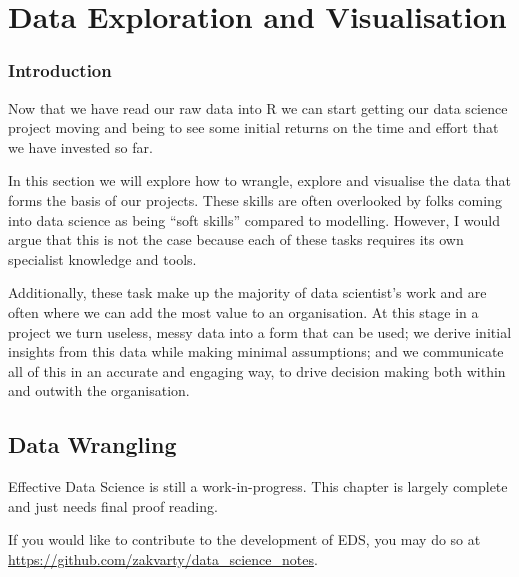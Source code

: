 \documentclass[
  letterpaper,
  DIV=11,
  numbers=noendperiod]{scrreprt}
\begin{document}
\part{Data Exploration and Visualisation}

\section*{Introduction}\label{edav-introduction}


Now that we have read our raw data into R we can start getting our data
science project moving and being to see some initial returns on the time
and effort that we have invested so far.

In this section we will explore how to wrangle, explore and visualise
the data that forms the basis of our projects. These skills are often
overlooked by folks coming into data science as being ``soft skills''
compared to modelling. However, I would argue that this is not the case
because each of these tasks requires its own specialist knowledge and
tools.

Additionally, these task make up the majority of data scientist's work
and are often where we can add the most value to an organisation. At
this stage in a project we turn useless, messy data into a form that can
be used; we derive initial insights from this data while making minimal
assumptions; and we communicate all of this in an accurate and engaging
way, to drive decision making both within and outwith the organisation.

\chapter{Data Wrangling}\label{edav-wrangling}

\begin{tcolorbox}[enhanced jigsaw, leftrule=.75mm, bottomtitle=1mm, toprule=.15mm, colbacktitle=quarto-callout-note-color!10!white, breakable, colback=white, bottomrule=.15mm, opacityback=0, colframe=quarto-callout-note-color-frame, title=\textcolor{quarto-callout-note-color}{\faInfo}\hspace{0.5em}{Note}, titlerule=0mm, toptitle=1mm, opacitybacktitle=0.6, arc=.35mm, rightrule=.15mm, coltitle=black, left=2mm]

Effective Data Science is still a work-in-progress. This chapter is
largely complete and just needs final proof reading.

If you would like to contribute to the development of EDS, you may do so
at \url{https://github.com/zakvarty/data_science_notes}.

\end{tcolorbox}
\end{document}
